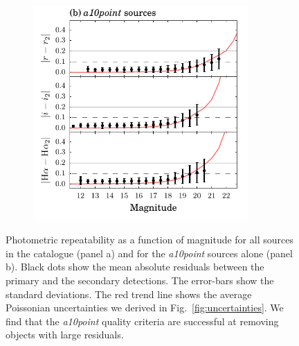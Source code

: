 \documentclass[a4paper,useAMS,usenatbib]{mn2e}
\begin{document}
\begin{figure}
\begin{subfigure}[b]{\linewidth}
\includegraphics[width=0.9\textwidth]{figures/repeatability/repeatability-a10point.pdf}
\caption{}
\label{fig:pairmag_a10}
\end{subfigure}
\caption{Photometric repeatability as a function of magnitude
         for all sources in the catalogue (panel a)
         and for the \emph{a10point} sources alone (panel b).
         Black dots show the mean absolute residuals
         between the primary and the secondary detections.
         The error-bars show the standard deviations.
         The red trend line shows the average Poissonian uncertainties
         we derived in Fig.~\ref{fig:uncertainties}.
         We find that the \emph{a10point} quality criteria are successful
         at removing objects with large residuals.
    }
\end{figure}
\end{document}
